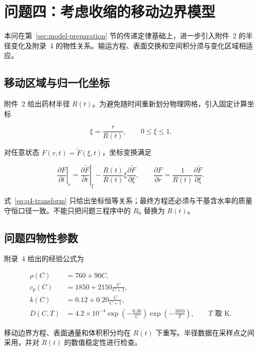 \section{问题四：考虑收缩的移动边界模型}

本问在第~\ref{sec:model-preparation} 节的传递定律基础上，进一步引入附件~2 的半径变化及附录~4 的物性关系。输运方程、表面交换和空间积分须与变化区域相适应。

\subsection{移动区域与归一化坐标}

附件~2 给出药材半径 $R(t)$。为避免随时间重新划分物理网格，引入固定计算坐标

\begin{equation}
  \xi=\frac{r}{R(t)},\qquad 0\le \xi\le 1.
  \label{eq:q4-xi}
\end{equation}

对任意状态 $F(r,t)=\widetilde F(\xi,t)$，坐标变换满足

\begin{equation}
  \left.\frac{\partial F}{\partial t}\right|_r
  =\left.\frac{\partial \widetilde F}{\partial t}\right|_\xi
  -\frac{\dot R(t)}{R(t)}\xi
  \frac{\partial \widetilde F}{\partial \xi},
  \qquad
  \frac{\partial F}{\partial r}
  =\frac{1}{R(t)}\frac{\partial \widetilde F}{\partial \xi}.
  \label{eq:q4-transform}
\end{equation}

式~\eqref{eq:q4-transform} 只给出坐标恒等关系；最终方程还必须与干基含水率的质量守恒口径一致。不能只把问题三程序中的 $R_0$ 替换为 $R(t)$。

\subsection{问题四物性参数}

附录~4 给出的经验公式为

\begin{align}
  \rho(C)&=760+90C, \\
  c_p(C)&=1850+2150\frac{C}{C+1}, \\
  k(C)&=0.12+0.20\frac{C}{C+1}, \\
  D(C,T)&=4.2\times10^{-4}
  \exp\left(-\frac{0.30}{C}\right)
  \exp\left(-\frac{3850}{T}\right),
  \qquad T\text{ 取 K}.
  \label{eq:q4-properties}
\end{align}

移动边界方程、表面通量和体积积分均在 $R(t)$ 下重写。半径数据在采样点之间采用，并对 $\dot R(t)$ 的数值稳定性进行检查。


